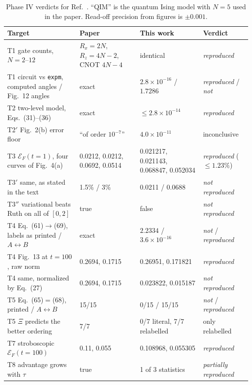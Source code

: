 \documentclass[aps,pra,reprint,superscriptaddress,nofootinbib]{revtex4-2}
\newcommand{\verdict}[1]{\textsl{#1}}
\begin{document}
\begin{table}[t]
\caption{Phase IV verdicts for Ref.~\cite{BeyondTrot2026}. ``QIM'' is the quantum Ising model
with $N=5$ used in the paper. Read-off precision from figures is $\pm0.001$.}
\label{tab:bt}
\begin{ruledtabular}
\begin{tabular}{p{6.4cm}p{3.6cm}p{3.6cm}l}
Target & Paper & This work & Verdict \\
\midrule
T1 gate counts, $N=2$--$12$ & $R_x=2N$, $R_z=4N-2$, CNOT $4N-4$ & identical & \verdict{reproduced} \\
T1 circuit vs \texttt{expm}, computed angles / Fig.~12 angles & exact & $2.8\times10^{-16}$ / $1.7286$ & \verdict{reproduced} / \verdict{not} \\
T2 two-level model, Eqs.~(31)--(36) & exact & $\le2.8\times10^{-14}$ & \verdict{reproduced} \\
T2$'$ Fig.~2(b) error floor & ``of order $10^{-7}$'' & $4.0\times10^{-11}$ & inconclusive \\
T3 $\mathcal E_F(t{=}1)$, four curves of Fig.~4(a) & 0.0212, 0.0212, 0.0692, 0.0514 & 0.021217, 0.021143, 0.068847, 0.052034 & \verdict{reproduced} ($\le1.23\%$) \\
T3$'$ same, as stated in the text & 1.5\% / 3\% & 0.0211 / 0.0688 & \verdict{not reproduced} \\
T3$''$ variational beats Ruth on all of $[0,2]$ & true & false & \verdict{not reproduced} \\
T4 Eq.~(61)$\to$(69), labels as printed / $A\leftrightarrow B$ & exact & $2.2334$ / $3.6\times10^{-16}$ & \verdict{not} / \verdict{reproduced} \\
T4 Fig.~13 at $t=100$, raw norm & 0.2694, 0.1715 & 0.26951, 0.171821 & \verdict{reproduced} \\
T4 same, normalized by Eq.~(27) & 0.2694, 0.1715 & 0.023822, 0.015187 & \verdict{not reproduced} \\
T5 Eq.~(65)$=$(68), printed / $A\leftrightarrow B$ & 15/15 & 0/15 / 15/15 & \verdict{not} / \verdict{reproduced} \\
T5 $\Xi$ predicts the better ordering & 7/7 & 0/7 literal, 7/7 relabelled & only relabelled \\
T7 stroboscopic $\mathcal E_F(t{=}100)$ & 0.11, 0.055 & 0.108968, 0.055305 & \verdict{reproduced} \\
T8 advantage grows with $\tau$ & true & 1 of 3 statistics & \verdict{partially reproduced} \\
\end{tabular}
\end{ruledtabular}
\end{table}
\end{document}
